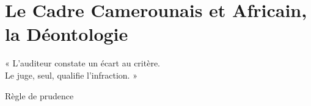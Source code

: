 
\chapter{Le Cadre Camerounais et Africain, la Déontologie}
\label{chap:droit}

\epigraph{%
    « L'auditeur constate un écart au critère.\\
    Le juge, seul, qualifie l'infraction. »%
}{Règle de prudence}


